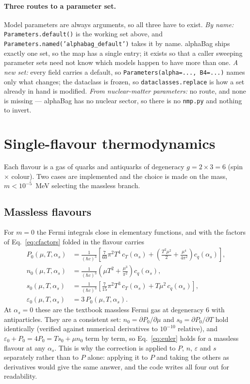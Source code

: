 \documentclass[aps,prc,onecolumn,superscriptaddress,nofootinbib,10pt]{revtex4-2}
\newcommand{\hc}{(\hbar c)^3}
\newcommand{\as}{\alpha_s}
\begin{document}
\paragraph{Three routes to a parameter set.} Model parameters are always
arguments, so all three have to exist. \emph{By name:}
\texttt{Parameters.default()} is the working set above, and
\texttt{Parameters.named('alphabag\_default')} takes it by name. alphaBag ships
exactly one set, so the map has a single entry; it exists so that a caller
sweeping parameter sets need not know which models happen to have more than
one. \emph{A new set:} every field carries a default, so
\texttt{Parameters(alpha=..., B4=...)} names only what changes; the dataclass
is frozen, so \texttt{dataclasses.replace} is how a set already in hand is
modified. \emph{From nuclear-matter parameters:} no route, and none is missing
--- alphaBag has no nuclear sector, so there is no \texttt{nmp.py} and nothing
to invert.

\section{Single-flavour thermodynamics}
\label{sec:kinetic}

Each flavour is a gas of quarks and antiquarks of degeneracy
$g = 2 \times 3 = 6$ (spin $\times$ colour). Two cases are implemented and the
choice is made on the mass, $m < 10^{-5}$~MeV selecting the massless branch.

\subsection{Massless flavours}

For $m = 0$ the Fermi integrals close in elementary functions, and with the
factors of Eq.~\eqref{eq:cfactors} folded in the flavour carries
%
\begin{align}
P_0(\mu, T, \as) &= \frac{1}{\hc} \left[
    \frac{7}{60}\pi^2 T^4\, c_T(\as)
    + \left( \frac{T^2 \mu^2}{2} + \frac{\mu^4}{4\pi^2} \right) c_q(\as)
    \right] ,
\label{eq:P0} \\
n_0(\mu, T, \as) &= \frac{1}{\hc}
    \left( \mu T^2 + \frac{\mu^3}{\pi^2} \right) c_q(\as) ,
\label{eq:n0} \\
s_0(\mu, T, \as) &= \frac{1}{\hc} \left[
    \frac{7}{15}\pi^2 T^3\, c_T(\as) + T \mu^2\, c_q(\as) \right] ,
\label{eq:s0} \\
\varepsilon_0(\mu, T, \as) &= 3\, P_0(\mu, T, \as) .
\label{eq:e0}
\end{align}
%
At $\as = 0$ these are the textbook massless Fermi gas at degeneracy $6$ with
antiparticles. They are a consistent set: $n_0 = \partial P_0/\partial\mu$ and
$s_0 = \partial P_0 / \partial T$ hold identically (verified against numerical
derivatives to $10^{-10}$ relative), and $\varepsilon_0 + P_0 = 4P_0 = T s_0 +
\mu n_0$ term by term, so Eq.~\eqref{eq:euler} holds for a massless flavour at
any $\as$. This is why the correction is applied to $P$, $n$, $\varepsilon$
and $s$ separately rather than to $P$ alone: applying it to $P$ and taking the
others as derivatives would give the same answer, and the code writes all four
out for readability.
\end{document}
